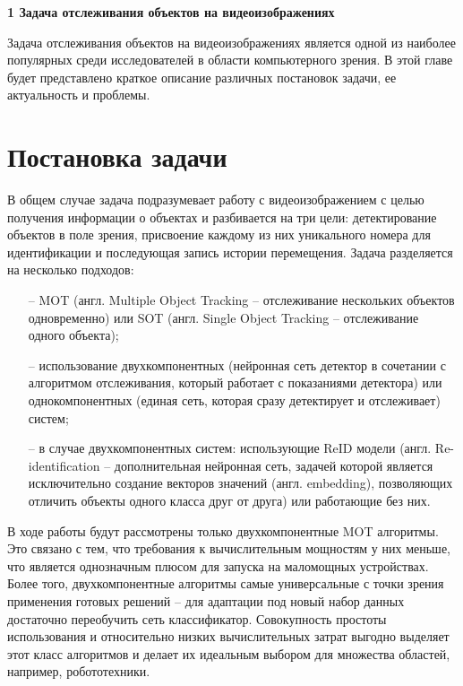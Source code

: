 \newpage
\begin{flushleft}
  \textbf{\large 1 Задача отслеживания объектов на видеоизображениях}
\end{flushleft}

Задача отслеживания объектов на видеоизображениях является одной из наиболее популярных среди исследователей в области компьютерного зрения. В этой главе будет представлено краткое описание различных постановок задачи, ее актуальность и проблемы. 


\section{Постановка задачи}
В общем случае задача подразумевает работу с видеоизображением с целью получения информации о объектах и разбивается на три цели:
детектирование объектов в поле зрения, присвоение каждому из них уникального номера для идентификации и последующая запись истории перемещения. Задача разделяется на несколько подходов:
\begin{itemize}
    \item[--] MOT (англ. Multiple Object Tracking -- отслеживание нескольких объектов одновременно) или SOT (англ. Single Object Tracking -- отслеживание одного объекта);
    \item[--] использование двухкомпонентных (нейронная сеть детектор в сочетании с алгоритмом отслеживания, который работает с показаниями детектора) или однокомпонентных (единая сеть, которая сразу детектирует и отслеживает) систем;
    \item[--] в случае двухкомпонентных систем: использующие ReID модели (англ. Re-identification -- дополнительная нейронная сеть, задачей которой является исключительно создание векторов значений (англ. embedding), позволяющих отличить объекты одного класса друг от друга) или работающие без них.
\end{itemize}

В ходе работы будут рассмотрены только двухкомпонентные MOT алгоритмы. Это связано с тем, что требования к вычислительным мощностям у них меньше, что является однозначным плюсом для запуска на маломощных устройствах.
Более того, двухкомпонентные алгоритмы самые универсальные с точки зрения применения готовых решений -- для адаптации под новый набор данных достаточно переобучить сеть классификатор.
Совокупность простоты использования и относительно низких вычислительных затрат выгодно выделяет этот класс алгоритмов и делает их идеальным выбором для множества областей, например, робототехники.

